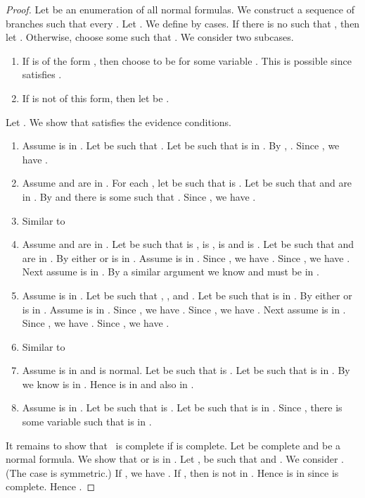 \begin{proof}
  Let  be an enumeration of all
  normal formulas.  We construct a sequence
   of
  branches such that every .  Let .  We define  by cases.  If there is
  no  such that , then let .  Otherwise, choose
  some  such that
  .  We consider two
  subcases.
  \begin{enumerate}[(1)]
\item If  is of the form ,
    then choose  to be
     for some
    variable .  This is possible since 
    satisfies .
  \item If  is not of this form, then let
     be .
  \end{enumerate}
  Let . 
We show that  satisfies the evidence conditions.
\begin{enumerate}[\EMat]
\item[{\EDN}] Assume  is in .
  Let  be such that .  Let
   be such that  is in .
  By ,
  .  Since
  , we have .
\item[{\EMat}] Assume  and  are in .  For each
  , let  be such that 
  is .  Let  be such
  that  and  are in .
  By   and there is some  such
  that .  Since
  , we have .
\item[{\EDec}] Similar to   \item[{\ECon}] Assume  and  are in .  Let  be such that
   is ,  is ,  is
   and  is .  Let 
  be such that  and  are in
  .  By  either  or  is in .
  Assume  is in .
  Since , we have .  Since , we have .  Next assume  is in .
  By a similar argument we know  and  must be in .
\item[{\EBQ}] Assume  is in .  Let
   be such that , , 
  and .  Let  be such that
   is in .  By  either
   or  is in
  .  Assume  is in
  .  Since , we have .  Since
  , we
  have .  Next assume  is in .  Since , we have .  Since , we have .
\item[{\EBE}] Similar to  \item[{\EFQ}] Assume  is in  and
   is normal.  Let  be such that
   is .
  Let  be
  such that  is in .
  By  we know  is
  in .  Hence  is in
   and also in .
\item[{\EFE}] Assume  is in
  .  Let  be such that  is
  .  Let  be such that
   is in .  Since
  , there is some
  variable  such that  is
  in .
\end{enumerate}
It remains to show that~ is complete if  is
complete.  Let  be complete and  be a normal
formula.  We show that  or  is in .
Let ,  be such that  and .
We consider . (The case  is symmetric.)  If
, we have .  If , then  is not in .
Hence  is in  since
 is complete.  Hence .
\end{proof}

